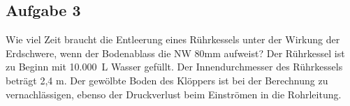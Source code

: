 \documentclass[nobib]{tufte-book}
\begin{document}
\begin{marginfigure}[-3cm]
\caption{Beim Venturi-Rohr lässt sich die Fließgeschwindigkeit über den Höhenunterschied der angesaugten Flüssigkeit in einem Rohr ablesen, welches die Verengung mit dem normalen Rohrdurchmesser verbindet.}
\end{marginfigure}
%
%
%
%



\subsection*{Aufgabe 3}
Wie viel Zeit braucht die Entleerung eines Rührkessels unter der Wirkung der \mbox{Erdschwere}, wenn der Bodenablass die NW 80mm aufweist? Der Rührkessel ist zu Beginn mit \mbox{10.000 L} Wasser gefüllt. Der Innendurchmesser des Rührkessels beträgt 2,4 m. Der gewölbte Boden des Klöppers ist bei der Berechnung zu vernachlässigen, ebenso der Druckverlust beim Einströmen in die Rohrleitung.
\end{document}
